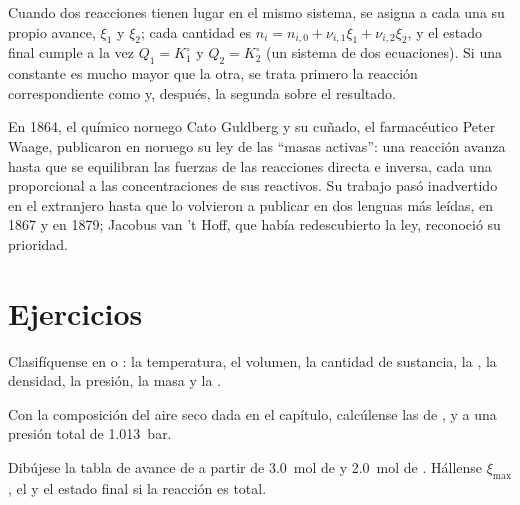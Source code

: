 \begin{method}\label{met:b1:extent-q-and-k:two-reactions}
Cuando dos reacciones tienen lugar en el mismo sistema, se asigna a cada
una su propio avance, $\xi_1$ y $\xi_2$; cada cantidad es $n_i = n_{i,0} + \nu_{i,1}\xi_1
+ \nu_{i,2}\xi_2$, y el estado final cumple a la vez $Q_1 = K_1^\circ$ y
$Q_2 = K_2^\circ$ (un sistema de dos ecuaciones). Si una constante es
mucho mayor que la otra, se trata primero la reacción correspondiente
como  y, después, la segunda sobre el resultado.
\end{method}

\begin{history}
En 1864, el químico noruego Cato Guldberg y su cuñado, el farmacéutico
Peter Waage, publicaron en noruego su ley de las ``masas activas'': una
reacción avanza hasta que se equilibran las fuerzas de las reacciones
directa e inversa, cada una proporcional a las concentraciones de sus
reactivos. Su trabajo pasó inadvertido en el extranjero hasta que lo
volvieron a publicar en dos lenguas más leídas, en 1867 y en 1879;
Jacobus van 't Hoff, que había redescubierto la ley, reconoció su
prioridad.
\end{history}

\section{Ejercicios}

\begin{exercise}[$\star$]\label{exo:b1:extent-q-and-k:1}
Clasifíquense en  o : la temperatura, el volumen, la
cantidad de sustancia, la , la densidad, la presión,
la masa y la .
\end{exercise}

\begin{exercise}[$\star$]\label{exo:b1:extent-q-and-k:2}
Con la composición del aire seco dada en el capítulo, calcúlense las
 de ,  y  a una presión total de
\qty{1.013}{bar}.
\end{exercise}

\begin{exercise}[$\star$]\label{exo:b1:extent-q-and-k:3}
Dibújese la tabla de avance de  a partir de
\qty{3.0}{mol} de  y \qty{2.0}{mol} de . Hállense
$\xi_{\max}$, el  y el estado final si la reacción es
total.
\end{exercise}

